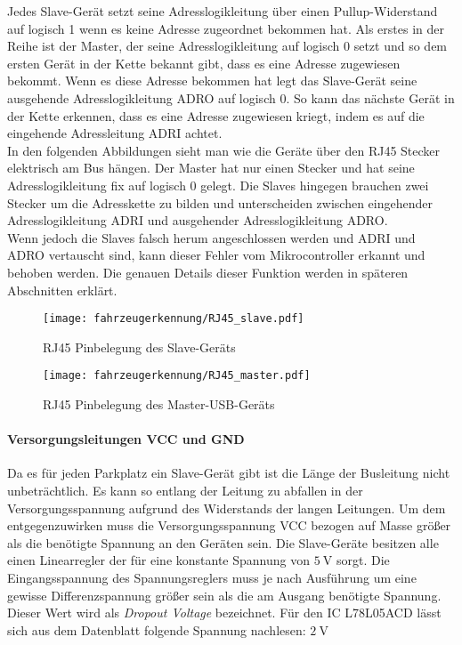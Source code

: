 Jedes Slave-Gerät setzt seine Adresslogikleitung über einen Pullup-Widerstand auf logisch 1 wenn es keine Adresse zugeordnet bekommen hat.
Als erstes in der Reihe ist der Master, der seine Adresslogikleitung auf logisch 0 setzt und so dem ersten Gerät in der Kette bekannt gibt, dass es eine Adresse zugewiesen bekommt. Wenn es
diese Adresse bekommen hat legt das Slave-Gerät seine ausgehende Adresslogikleitung ADRO auf logisch 0. So kann das nächste Gerät in der Kette erkennen, dass es eine Adresse zugewiesen kriegt, 
indem es auf die eingehende Adressleitung ADRI achtet.\\
In den folgenden Abbildungen sieht man wie die Geräte über den RJ45 Stecker elektrisch am Bus hängen. Der Master hat nur einen Stecker und hat seine Adresslogikleitung fix auf logisch 0 gelegt.
Die Slaves hingegen brauchen zwei Stecker um die Adresskette zu bilden und unterscheiden zwischen eingehender Adresslogikleitung ADRI und ausgehender Adresslogikleitung ADRO. \\
Wenn jedoch die Slaves falsch herum angeschlossen werden und ADRI und ADRO vertauscht sind, kann dieser Fehler vom Mikrocontroller erkannt und behoben werden. Die genauen Details dieser Funktion 
werden in späteren Abschnitten erklärt. 

\begin{figure}[H]
    \centering
    \texttt{[image: fahrzeugerkennung/RJ45\_slave.pdf]}
    \caption{RJ45 Pinbelegung des Slave-Geräts}
\end{figure}

\begin{figure}[H]
    \centering
    \texttt{[image: fahrzeugerkennung/RJ45\_master.pdf]}
    \caption{RJ45 Pinbelegung des Master-USB-Geräts}
\end{figure}

\paragraph{Versorgungsleitungen VCC und GND}\mbox{}

Da es für jeden Parkplatz ein Slave-Gerät gibt ist die Länge der Busleitung nicht unbeträchtlich. Es kann so entlang der Leitung zu abfallen in der Versorgungsspannung aufgrund des Widerstands der langen Leitungen.
Um dem entgegenzuwirken muss die Versorgungsspannung VCC bezogen auf Masse größer als die benötigte Spannung an den Geräten sein. Die Slave-Geräte besitzen alle einen Linearregler der für eine konstante Spannung von $\SI{5}{\volt}$ sorgt.
Die Eingangsspannung des Spannungsreglers muss je nach Ausführung um eine gewisse Differenzspannung größer sein als die am Ausgang benötigte Spannung. Dieser Wert wird als \textit{Dropout Voltage} bezeichnet. 
Für den IC L78L05ACD lässt sich aus dem Datenblatt folgende Spannung nachlesen: $\SI{2}{\volt}$

